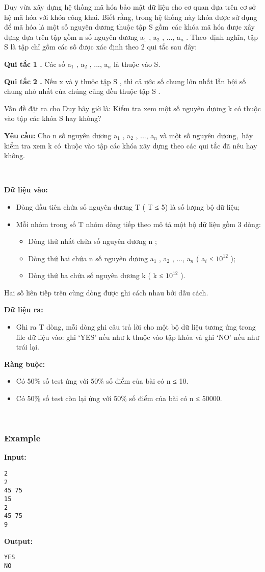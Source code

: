 

Duy vừa xây dựng hệ thống mã hóa bảo mật dữ liệu cho cơ quan dựa trên cơ sở hệ mã hóa với khóa công khai. Biết rằng, trong hệ thống này khóa được sử dụng để mã hóa là một số nguyên dương thuộc tập S gồm các khóa mã hóa được xây dựng dựa trên tập gồm n số nguyên dương a$_ 1 $ , a$_ 2 $ , ..., a$_ n $ . Theo định nghĩa, tập S là tập chỉ gồm các số được xác định theo 2 qui tắc sau đây:

\textbf{Qui tắc}\textbf{ 1 .} Các số a$_ 1 $ , a$_ 2 $ , ..., a$_ n $ là thuộc vào S.

\textbf{Qui tắc}\textbf{ 2 .} Nếu x và у thuộc tập S , thì cả ước số chung lớn nhất lẫn bội số chung nhỏ nhất của chúng cũng đều thuộc tập S .

Vấn đề đặt ra cho Duy bây giờ là: Kiểm tra xem một số nguyên dương k có thuộc vào tập các khóa S  hay không?

\textbf{Yêu }\textbf{}\textbf{ cầu: }\textbf{} Cho n số nguyên dương a$_ 1 $ , a$_ 2 $ , ..., a$_ n $ và một số nguyên dương, hãy kiểm tra xem k có thuộc vào tập các khóa xây dựng theo các qui tắc đã nêu hay không.

 

\textbf{Dữ liệu vào: }
\begin{itemize}
	\item Dòng đầu tiên chứa số nguyên dương T ( T ≤ 5) là số lượng bộ dữ liệu;
	\item Mỗi nhóm trong số T nhóm dòng tiếp theo mô tả một bộ dữ liệu gồm 3 dòng:
\begin{itemize}
	\item Dòng thứ nhất chứa số nguyên dương n ;
	\item Dòng thứ hai chứa n số nguyên dương a$_ 1 $ , a$_ 2 $ , ..., a$_ n $ ( a$_ i $ ≤ $10^{12}$ );
	\item Dòng thứ ba chứa số nguyên dương k ( k ≤ $10^{12}$ ).
\end{itemize}
\end{itemize}

Hai số liên tiếp trên cùng dòng được ghi cách nhau bởi dấu cách.

\textbf{Dữ liệu ra:}
\begin{itemize}
	\item Ghi ra T dòng, mỗi dòng ghi câu trả lời cho một bộ dữ liệu tương ứng trong file dữ liệu vào: ghi ‘YES’ nếu như k thuộc vào tập khóa và ghi ‘NO’ nếu như trái lại.
\end{itemize}

\textbf{Ràng buộc:}
\begin{itemize}
	\item Có 50\% số test ứng với 50\% số điểm của bài có n ≤ 10.
	\item Có 50\% số test còn lại ứng với 50\% số điểm của bài có n ≤ 50000.
\end{itemize}

 

\subsubsection{Example}

\textbf{Input: }
\begin{verbatim}
2
2
45 75
15
2
45 75
9\end{verbatim}

\textbf{Output: }
\begin{verbatim}
YES
NO\end{verbatim}
